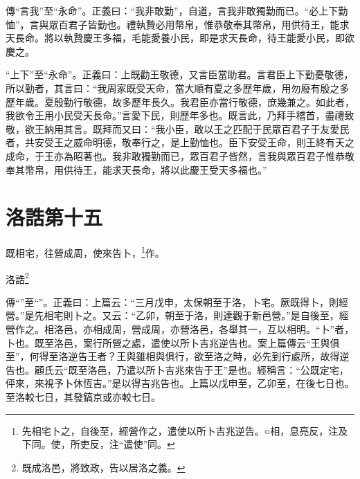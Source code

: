 {\noindent\zhuan{}\fzbyks 傳“言我”至“永命”。正義曰：“我非敢勤”，自道，言我非敢獨勤而已。“必上下勤恤”，言與眾百君子皆勤也。禮執贄必用幣帛，惟恭敬奉其幣帛，用供待王，能求天長命。將以執贄慶王多福，毛能愛養小民，即是求天長命，待王能愛小民，即欲慶之。 \par}

{\noindent\shu{}\fzkt “上下”至“永命”。正義曰：上既勸王敬德，又言臣當助君。言君臣上下勤憂敬德，所以勤者，其言曰：“我周家既受天命，當大順有夏之多歷年歲，用勿廢有殷之多歷年歲。夏殷勤行敬德，故多歷年長久。我君臣亦當行敬德，庶幾兼之。如此者，我欲令王用小民受天長命。”言愛下民，則歷年多也。既言此，乃拜手稽首，盡禮致敬，欲王納用其言。既拜而又曰：“我小臣，敢以王之匹配于民眾百君子于友愛民者，共安受王之威命明德，敬奉行之，是上勤恤也。臣下安受王命，則王終有天之成命，于王亦為昭著也。我非敢獨勤而已，眾百君子皆然，言我與眾百君子惟恭敬奉其幣帛，用供待王，能求天長命，將以此慶王受天多福也。” \par}

\section{洛誥第十五}


既相宅，往營成周，使來告卜，\footnote{先相宅卜之，自後至，經營作之，遣使以所卜吉兆逆告。○相，息亮反，注及下同。使，所吏反，注“遣使”同。}作。

洛誥\footnote{既成洛邑，將致政，告以居洛之義。}


{\noindent\zhuan{}\fzbyks 傳“”至“”。正義曰：上篇云：“三月戊申，太保朝至于洛，卜宅。厥既得卜，則經營。”是先相宅則卜之。又云：“乙卯，朝至于洛，則達觀于新邑營。”是自後至，經營作之。相洛邑，亦相成周，營成周，亦營洛邑，各舉其一，互以相明。“卜”者，卜也。既至洛邑，案行所營之處，遣使以所卜吉兆逆告也。案上篇傳云“王與俱至”，何得至洛逆告王者？王與雖相與俱行，欲至洛之時，必先到行處所，故得逆告也。顧氏云“既至洛邑，乃遣以所卜吉兆來告于王”是也。經稱言：“公既定宅，伻來，來視予卜休恆吉。”是以得吉兆告也。上篇以戊申至，乙卯至，在後七日也。至洛較七日，其發鎬京或亦較七日。 \par}

